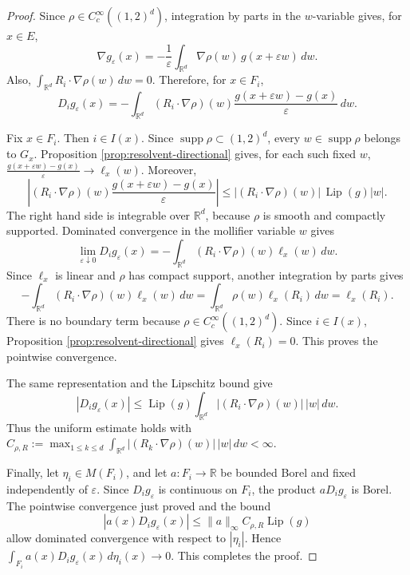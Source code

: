 \documentclass[aihp]{imsart}
\numberwithin{equation}{section}
\theoremstyle{plain}
\theoremstyle{definition}
\newcommand{\1}{\mathbf 1}
\begin{document}
\begin{proof}
Since \(\rho\in C_c^\infty((1,2)^d)\), integration by parts in the
\(w\)-variable gives, for \(x\in E\),
\[
\nabla g_\varepsilon(x)
=
-\frac1{\varepsilon}
\int_{\mathbb R^d}
\nabla\rho(w)\,g(x+\varepsilon w)\,dw .
\]
Also, $\int_{\mathbb R^d} R_i\cdot\nabla\rho(w)\,dw=0.$ Therefore, for \(x\in F_i\),
\begin{equation}
D_i g_\varepsilon(x)
=
-\int_{\mathbb R^d}
(R_i\cdot\nabla\rho)(w)
\frac{g(x+\varepsilon w)-g(x)}{\varepsilon}\,dw .
\end{equation}

Fix \(x\in F_i\). Then \(i\in I(x)\). Since
\(\operatorname{supp}\rho\subset (1,2)^d\), every
\(w\in\operatorname{supp}\rho\) belongs to \(G_x\). Proposition \ref{prop:resolvent-directional} gives,
for each such fixed \(w\),
\(
\frac{g(x+\varepsilon w)-g(x)}{\varepsilon}
\longrightarrow
\ell_x(w).\) Moreover,
\[
\left|
(R_i\cdot\nabla\rho)(w)
\frac{g(x+\varepsilon w)-g(x)}{\varepsilon}
\right|
\le
|(R_i\cdot\nabla\rho)(w)|\,\operatorname{Lip}(g)|w|.
\]
The right hand side is integrable over \(\mathbb R^d\), because
\(\rho\) is smooth and compactly supported. Dominated convergence in the
mollifier variable \(w\) gives
\begin{equation}
\lim_{\varepsilon\downarrow0}D_i g_\varepsilon(x)
=
-\int_{\mathbb R^d}
(R_i\cdot\nabla\rho)(w)\ell_x(w)\,dw .
\end{equation}
Since \(\ell_x\) is linear and \(\rho\) has compact support, another
integration by parts gives
\begin{equation}
-\int_{\mathbb R^d}
(R_i\cdot\nabla\rho)(w)\ell_x(w)\,dw
=
\int_{\mathbb R^d}\rho(w)\ell_x(R_i)\,dw
=
\ell_x(R_i).
\end{equation}
There is no boundary term because \(\rho\in C_c^\infty((1,2)^d)\).
Since \(i\in I(x)\), Proposition \ref{prop:resolvent-directional} gives \(\ell_x(R_i)=0\). This proves
the pointwise convergence.

The same representation and the Lipschitz bound give
\[
|D_i g_\varepsilon(x)|
\le
\operatorname{Lip}(g)
\int_{\mathbb R^d}
|(R_i\cdot\nabla\rho)(w)|\,|w|\,dw .
\]
Thus the uniform estimate holds with $C_{\rho,R}
:=
\max_{1\le k\le d}
\int_{\mathbb R^d}
|(R_k\cdot\nabla\rho)(w)|\,|w|\,dw
<\infty .$

Finally, let \(\eta_i\in M(F_i)\), and let
\(a:F_i\to\mathbb R\) be bounded Borel and fixed independently of
\(\varepsilon\). Since \(D_i g_\varepsilon\) is continuous on \(F_i\), the
product \(aD_i g_\varepsilon\) is Borel. The pointwise convergence just proved
and the bound
\[
|a(x)D_i g_\varepsilon(x)|
\le
\|a\|_\infty C_{\rho,R}\operatorname{Lip}(g)
\]
allow dominated convergence with respect to \(|\eta_i|\). Hence
\(\int_{F_i}a(x)D_i g_\varepsilon(x)\,d\eta_i(x)
\longrightarrow0 .\)
This completes the proof.
\end{proof}
\end{document}
